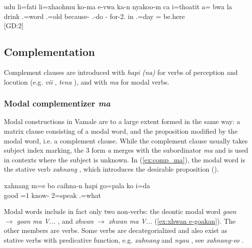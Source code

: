 \ea\label{ex:koma}\gll udu li=fati li=xhaohmu ko-ma e-vwa ka-n nyakoo-m ca i=thoatit a= bwa la\\
 drink .=word .=old because- .-do - for-2. in .=day =  be.here\\
\glt {} {[GD:2]}
\z



\subsection{Complementation}
Complement clauses are introduced with \textit{hapi (na)} for verbs of perception and locution (e.g. \textit{vii} , \textit{tena} ), and with \textit{ma} for modal verbs. 

\subsubsection{Modal complementizer \textit{ma}}
\label{ssec:ma}

Modal constructions in Vamale are to a large extent formed in the same way: a matrix clause consisting of a modal word, and the proposition modified by the modal word, i.e. a complement clause. While the complement clause usually takes subject index marking, the 3 form \textit{a} merges with the subordinator \textit{ma} and is used in contexts where the subject is unknown. In (\ref{ex:comp_ma}), the modal word is the stative verb \textit{xahnang} , which introduces the desirable proposition ().

\ea \label{ex:comp_ma}
\gll xahnang m=e bo caihna-n hapi go=pala ko i=da\\
 good =1  know-  2=speak  .=what\\
\glt {}
\z

Modal words include in fact only two non-verbs: the deontic modal word \textit{goon}  $\rightarrow$ \textit{goon ma V...} , and \textit{xhwan}  $\rightarrow$ \textit{xhwan ma V...}  (\ref{ex:xhwan e-goakan}). The other members are verbs. Some verbs are decategorialized and also exist as stative verbs with predicative function, e.g. \textit{xahnang}  and \textit{nyau} , see \textit{xahnang-eo} .


